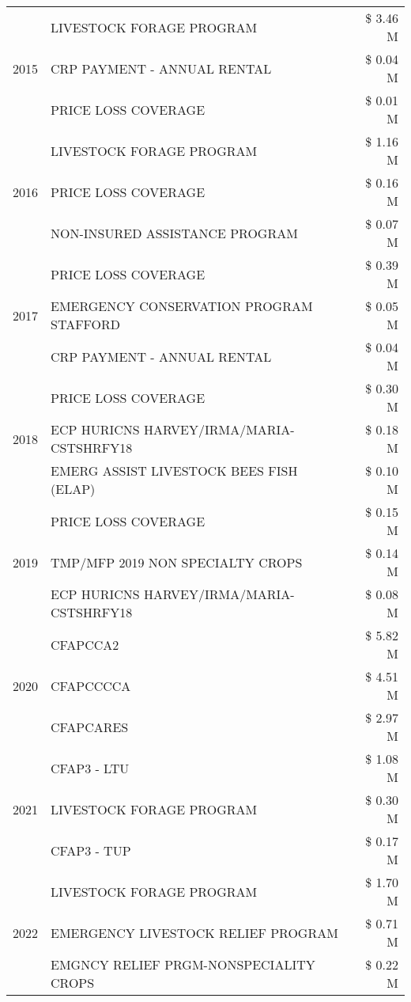 \begin{tabular}{llr}
\cline{1-3}
\multirow[t]{3}{*}{2015} & LIVESTOCK FORAGE PROGRAM & \$ 3.46 M \\
 & CRP PAYMENT - ANNUAL RENTAL & \$ 0.04 M \\
 & PRICE LOSS COVERAGE & \$ 0.01 M \\
\cline{1-3}
\multirow[t]{3}{*}{2016} & LIVESTOCK FORAGE PROGRAM & \$ 1.16 M \\
 & PRICE LOSS COVERAGE & \$ 0.16 M \\
 & NON-INSURED ASSISTANCE PROGRAM & \$ 0.07 M \\
\cline{1-3}
\multirow[t]{3}{*}{2017} & PRICE LOSS COVERAGE & \$ 0.39 M \\
 & EMERGENCY CONSERVATION PROGRAM STAFFORD & \$ 0.05 M \\
 & CRP PAYMENT - ANNUAL RENTAL & \$ 0.04 M \\
\cline{1-3}
\multirow[t]{3}{*}{2018} & PRICE LOSS COVERAGE & \$ 0.30 M \\
 & ECP HURICNS HARVEY/IRMA/MARIA-CSTSHRFY18 & \$ 0.18 M \\
 & EMERG ASSIST LIVESTOCK BEES FISH (ELAP) & \$ 0.10 M \\
\cline{1-3}
\multirow[t]{3}{*}{2019} & PRICE LOSS COVERAGE & \$ 0.15 M \\
 & TMP/MFP 2019 NON SPECIALTY CROPS & \$ 0.14 M \\
 & ECP HURICNS HARVEY/IRMA/MARIA-CSTSHRFY18 & \$ 0.08 M \\
\cline{1-3}
\multirow[t]{3}{*}{2020} & CFAPCCA2 & \$ 5.82 M \\
 & CFAPCCCCA & \$ 4.51 M \\
 & CFAPCARES & \$ 2.97 M \\
\cline{1-3}
\multirow[t]{3}{*}{2021} & CFAP3 - LTU & \$ 1.08 M \\
 & LIVESTOCK FORAGE PROGRAM & \$ 0.30 M \\
 & CFAP3 - TUP & \$ 0.17 M \\
\cline{1-3}
\multirow[t]{3}{*}{2022} & LIVESTOCK FORAGE PROGRAM & \$ 1.70 M \\
 & EMERGENCY LIVESTOCK RELIEF PROGRAM & \$ 0.71 M \\
 & EMGNCY RELIEF PRGM-NONSPECIALITY CROPS & \$ 0.22 M \\
\cline{1-3}
\bottomrule
\end{tabular}
